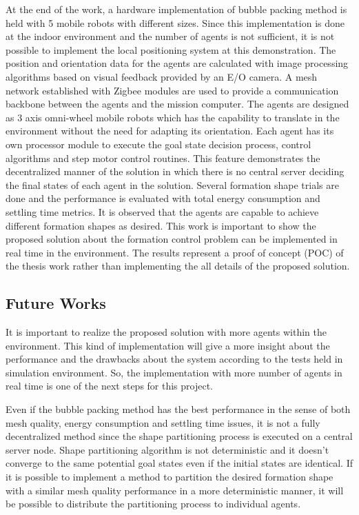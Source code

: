 \documentclass[twoside]{article}
\begin{document}
       At the end of the work, a hardware implementation of bubble packing method is held with 5 mobile robots with different sizes. Since this implementation is done at the  indoor environment and the number of agents is not sufficient, it is not possible to implement the local positioning system at this demonstration. The position and orientation data for the agents are calculated with image processing algorithms based on visual feedback provided by an E/O camera. A mesh network established with Zigbee modules are used to provide a communication backbone between the agents and the mission computer. The agents are designed as 3 axis omni-wheel mobile robots which has the capability to translate in the environment without the need for adapting its orientation. Each agent has its own processor module to execute the goal state decision process, control algorithms and step motor control routines. This feature demonstrates the decentralized manner of the solution in which  there is no central server deciding the final states of each agent in the solution. Several formation shape trials are done and the performance is evaluated with total energy consumption and settling time metrics. It is observed that the agents are capable to achieve different formation shapes as desired. This work is important to show the proposed solution about the formation control problem can be implemented in real time in the environment. The results represent a proof of concept (POC) of the thesis work rather than implementing the all details of the proposed solution.
       
       \subsection{Future Works}
       
       
		It is important to realize the proposed solution with more agents within the environment. This kind of  implementation will give a more insight about the performance and the drawbacks about the system according to the tests held in simulation environment. So, the implementation with more number of agents in real time is one of the next steps for this project.
		
    Even if the bubble packing method has the best performance in the sense of both mesh quality, energy consumption and settling time issues, it is not a fully decentralized method since the shape partitioning process is executed on a central server node. Shape partitioning algorithm is not deterministic and it doesn't converge to the same potential goal states even if the initial states are identical. If it is possible to implement a method to partition the desired formation shape with a similar mesh quality performance in a more deterministic manner, it will be possible to distribute the partitioning process to individual agents. 
    
\end{document}
